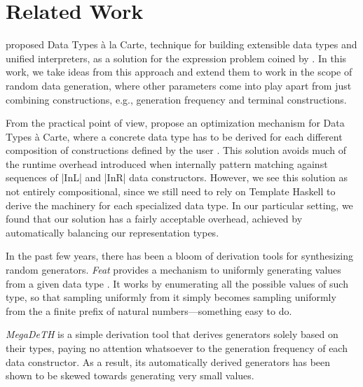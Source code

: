 \section{Related Work}
\label{sec:related}

\citeauthor{SwierstraDTC} \cite{SwierstraDTC} proposed Data Types \`a la Carte,
technique for building extensible data types and unified interpreters, as a
solution for the expression problem coined by \citeauthor{wadler1998expression}
\cite{wadler1998expression}.
%
In this work, we take ideas from this approach and extend them to work in the
scope of random data generation, where other parameters come into play apart
from just combining constructions, e.g., generation frequency and terminal
constructions.


From the practical point of view, \citeauthor{KiriyamaOptimizingDTC} propose an
optimization mechanism for Data Types \`a Carte, where a concrete data type has
to be derived for each different composition of constructions defined by the
user \cite{KiriyamaOptimizingDTC}.
%
This solution avoids much of the runtime overhead introduced when internally
pattern matching against sequences of |InL| and |InR| data constructors.
%
However, we see this solution as not entirely compositional, since we still need
to rely on Template Haskell to derive the machinery for each specialized data
type.
%
In our particular setting, we found that our solution has a fairly acceptable
overhead, achieved by automatically balancing our representation types.


In the past few years, there has been a bloom of derivation tools for
synthesizing random generators.
%
\emph{Feat} provides a mechanism to uniformly generating values from a given
data type \cite{DuregardJW12}.
%
It works by enumerating all the possible values of such type, so that sampling
uniformly from it simply becomes sampling uniformly from the a finite prefix of
natural numbers---something easy to do.


\emph{MegaDeTH} is a simple derivation tool that derives generators solely based
on their types, paying no attention whatsoever to the generation frequency of
each data constructor.
%
As a result, its automatically derived generators has been shown to be skewed
towards generating very small values\cite{DBLP:conf/haskell/MistaRH18}.


